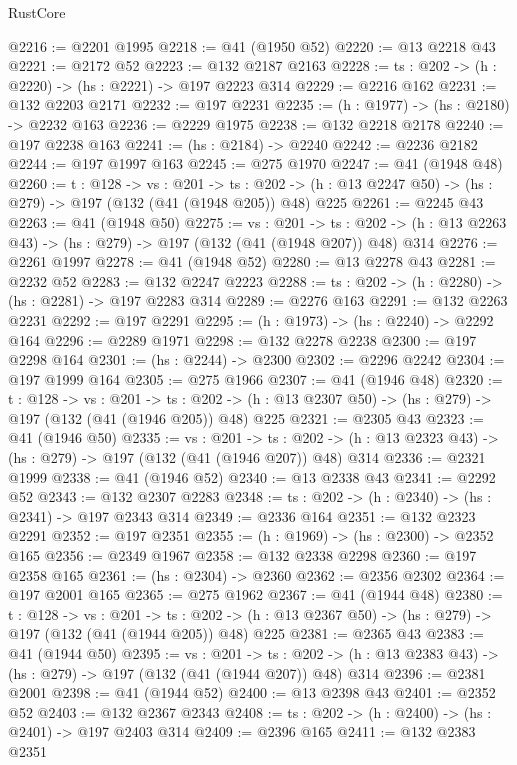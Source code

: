\begin{lexlean}{RustCore}
\begin{coremodule}
@2216 := @2201 @1995
@2218 := @41 (@1950 @52)
@2220 := @13 @2218 @43
@2221 := @2172 @52
@2223 := @132 @2187 @2163
@2228 := {ts : @202} -> (h : @2220) -> (hs : @2221) -> @197 @2223 @314
@2229 := @2216 @162
@2231 := @132 @2203 @2171
@2232 := @197 @2231
@2235 := (h : @1977) -> (hs : @2180) -> @2232 @163
@2236 := @2229 @1975
@2238 := @132 @2218 @2178
@2240 := @197 @2238 @163
@2241 := (hs : @2184) -> @2240
@2242 := @2236 @2182
@2244 := @197 @1997 @163
@2245 := @275 @1970
@2247 := @41 (@1948 @48)
@2260 := {t : @128} ->
  {vs : @201} ->
  {ts : @202} -> (h : @13 @2247 @50) -> (hs : @279) -> @197 (@132 (@41 (@1948 @205)) @48) @225
@2261 := @2245 @43
@2263 := @41 (@1948 @50)
@2275 := {vs : @201} ->
  {ts : @202} -> (h : @13 @2263 @43) -> (hs : @279) -> @197 (@132 (@41 (@1948 @207)) @48) @314
@2276 := @2261 @1997
@2278 := @41 (@1948 @52)
@2280 := @13 @2278 @43
@2281 := @2232 @52
@2283 := @132 @2247 @2223
@2288 := {ts : @202} -> (h : @2280) -> (hs : @2281) -> @197 @2283 @314
@2289 := @2276 @163
@2291 := @132 @2263 @2231
@2292 := @197 @2291
@2295 := (h : @1973) -> (hs : @2240) -> @2292 @164
@2296 := @2289 @1971
@2298 := @132 @2278 @2238
@2300 := @197 @2298 @164
@2301 := (hs : @2244) -> @2300
@2302 := @2296 @2242
@2304 := @197 @1999 @164
@2305 := @275 @1966
@2307 := @41 (@1946 @48)
@2320 := {t : @128} ->
  {vs : @201} ->
  {ts : @202} -> (h : @13 @2307 @50) -> (hs : @279) -> @197 (@132 (@41 (@1946 @205)) @48) @225
@2321 := @2305 @43
@2323 := @41 (@1946 @50)
@2335 := {vs : @201} ->
  {ts : @202} -> (h : @13 @2323 @43) -> (hs : @279) -> @197 (@132 (@41 (@1946 @207)) @48) @314
@2336 := @2321 @1999
@2338 := @41 (@1946 @52)
@2340 := @13 @2338 @43
@2341 := @2292 @52
@2343 := @132 @2307 @2283
@2348 := {ts : @202} -> (h : @2340) -> (hs : @2341) -> @197 @2343 @314
@2349 := @2336 @164
@2351 := @132 @2323 @2291
@2352 := @197 @2351
@2355 := (h : @1969) -> (hs : @2300) -> @2352 @165
@2356 := @2349 @1967
@2358 := @132 @2338 @2298
@2360 := @197 @2358 @165
@2361 := (hs : @2304) -> @2360
@2362 := @2356 @2302
@2364 := @197 @2001 @165
@2365 := @275 @1962
@2367 := @41 (@1944 @48)
@2380 := {t : @128} ->
  {vs : @201} ->
  {ts : @202} -> (h : @13 @2367 @50) -> (hs : @279) -> @197 (@132 (@41 (@1944 @205)) @48) @225
@2381 := @2365 @43
@2383 := @41 (@1944 @50)
@2395 := {vs : @201} ->
  {ts : @202} -> (h : @13 @2383 @43) -> (hs : @279) -> @197 (@132 (@41 (@1944 @207)) @48) @314
@2396 := @2381 @2001
@2398 := @41 (@1944 @52)
@2400 := @13 @2398 @43
@2401 := @2352 @52
@2403 := @132 @2367 @2343
@2408 := {ts : @202} -> (h : @2400) -> (hs : @2401) -> @197 @2403 @314
@2409 := @2396 @165
@2411 := @132 @2383 @2351

\end{coremodule}
\end{lexlean}
